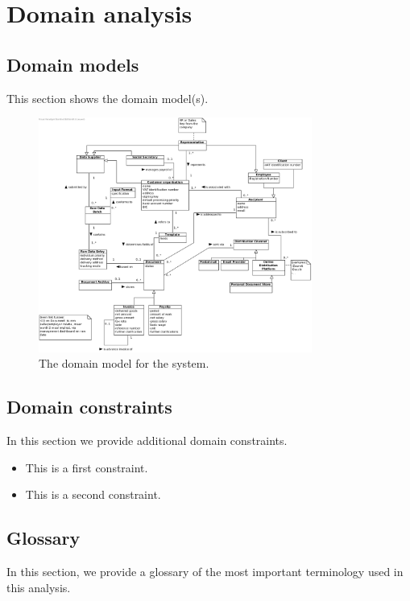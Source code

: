 \documentclass[a4paper,10pt]{article}
\begin{document}


\tableofcontents
\newpage

\section{Domain analysis}\label{sec:domain}
\subsection{Domain models}
This section shows the domain model(s).

\begin{figure}[!htp]
    \centering
    \includegraphics[width=0.8\textwidth]{domain_model.png}
    \caption{The domain model for the system.}\label{fig:domain_model}
\end{figure}

\subsection{Domain constraints}
In this section we provide additional domain constraints.

\begin{itemize}
    \item This is a first constraint.
    \item This is a second constraint.
\end{itemize}

\subsection{Glossary}
In this section, we provide a glossary of the most important terminology used
in this analysis.
\end{document}
